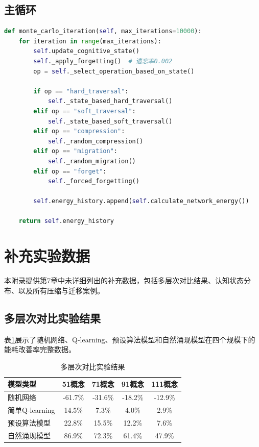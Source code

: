 \documentclass[12pt,a4paper]{article}
\begin{document}
\subsection{主循环}

\begin{lstlisting}[language=Python, caption=预设算法模型主循环]
def monte_carlo_iteration(self, max_iterations=10000):
    for iteration in range(max_iterations):
        self.update_cognitive_state()
        self._apply_forgetting()  # 遗忘率0.002
        op = self._select_operation_based_on_state()
        
        if op == "hard_traversal":
            self._state_based_hard_traversal()
        elif op == "soft_traversal":
            self._state_based_soft_traversal()
        elif op == "compression":
            self._random_compression()
        elif op == "migration":
            self._random_migration()
        elif op == "forget":
            self._forced_forgetting()
        
        self.energy_history.append(self.calculate_network_energy())
    
    return self.energy_history
\end{lstlisting}

\section{补充实验数据}
\label{app:supplementary_data}

本附录提供第7章中未详细列出的补充数据，包括多层次对比结果、认知状态分布、以及所有压缩与迁移案例。

\subsection{多层次对比实验结果}

表\ref{tab:app_multi_comparison}展示了随机网络、Q-learning、预设算法模型和自然涌现模型在四个规模下的能耗改善率完整数据。

\begin{table}[H]
\centering
\caption{多层次对比实验结果}
\label{tab:app_multi_comparison}
\begin{tabular}{lcccc}
\toprule
\textbf{模型类型} & \textbf{51概念} & \textbf{71概念} & \textbf{91概念} & \textbf{111概念} \\
\midrule
随机网络 & -61.7\% & -31.6\% & -18.2\% & -12.9\% \\
简单Q-learning & 14.5\% & 7.3\% & 4.0\% & 2.9\% \\
预设算法模型 & 22.8\% & 15.5\% & 12.2\% & 7.6\% \\
自然涌现模型 & 86.9\% & 72.3\% & 61.4\% & 47.9\% \\
\bottomrule
\end{tabular}
\end{table}
\end{document}
